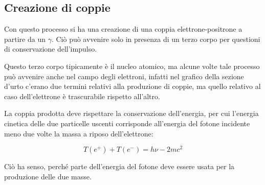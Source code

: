 \subsection{Creazione di coppie}

Con questo processo si ha una creazione di una coppia elettrone-positrone a partire da un $\gamma$. Ciò può avvenire solo in presenza di un terzo corpo per questioni di conservazione dell'impulso.

\begin{figure}[H]
    \centering
\end{figure}

Questo terzo corpo tipicamente è il nucleo atomico, ma alcune volte tale processo può avvenire anche nel campo degli elettroni, infatti nel grafico della sezione d'urto c'erano due termini relativi alla produzione di coppie, ma quello relativo al caso dell'elettrone è trascurabile rispetto all'altro.

La coppia prodotta deve rispettare la conservazione dell'energia, per cui l'energia cinetica delle due particelle uscenti corrisponde all'energia del fotone incidente meno due volte la massa a riposo dell'elettrone:

\begin{equation*}
    T(e^+) + T(e^-)=h\nu - 2mc^2
\end{equation*}

Ciò ha senso, perché parte dell'energia del fotone deve essere usata per la produzione delle due masse.

